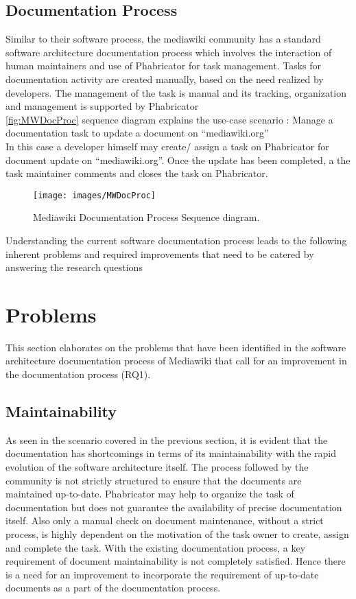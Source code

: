 \subsection{Documentation Process}
\indent Similar to their software process, the mediawiki community has a standard software architecture documentation process which involves the interaction of human maintainers and use of Phabricator for task management. Tasks for documentation activity are created manually, based on the need realized by developers. The management of the task is manual and its tracking, organization and management is supported by Phabricator
\\\indent \autoref{fig:MWDocProc} sequence diagram explains the use-case scenario : Manage a documentation task to update a document on \enquote{mediawiki.org}
\\\indent In this case a developer himself may create/ assign a task on Phabricator for document update on \enquote{mediawiki.org}. Once the update has been completed, a the task maintainer comments and closes the task on Phabricator.
\begin{figure}[H]
  \centering
  \texttt{[image: images/MWDocProc]}
  \caption[Current documentation process Sequence diagram]{Mediawiki Documentation Process Sequence diagram.}\label{fig:MWDocProc}
\end{figure}
\indent Understanding the current software documentation process leads to the following inherent problems and required improvements that need to be catered by answering the research questions

\section{Problems}
\indent This section elaborates on the problems that have been identified in the software architecture documentation process of Mediawiki that call for an improvement in the documentation process (RQ1).
\subsection{Maintainability}
\indent As seen in the scenario covered in the previous section, it is evident that the documentation has shortcomings in terms of its maintainability with the rapid evolution of the software architecture itself. The process followed by the community is not strictly structured to ensure that the documents are maintained up-to-date. Phabricator may help to organize the task of documentation but does not guarantee the availability of precise documentation itself. Also only a manual check on document maintenance, without a strict process, is highly dependent on the motivation of the task owner to create, assign and complete the task. With the existing documentation process, a key requirement of document maintainability is not completely satisfied. Hence there is a need for an improvement to incorporate the requirement of up-to-date documents as a part of the documentation process.
